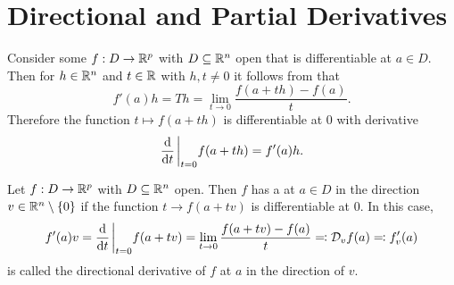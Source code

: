 \documentclass[../main.tex]{subfiles}
\begin{document}
\section[Derivatives II]{Directional and Partial Derivatives}

Consider some $f : D \to \mathbb{R}^p$ with $D \subseteq \mathbb{R}^n$ open that is differentiable at $a \in D$. Then for $h \in \mathbb{R}^n$ and $t \in \mathbb{R}$ with $h, t \neq 0$ it follows from  that
\[
    f'(a) h = Th = \lim_{t \to 0} \frac{f(a + th) - f(a)}{t}
.\]
Therefore the function $t \mapsto f(a+th)$ is differentiable at $0$ with derivative
\[
    \dv{t} \eval_{t=0} f(a+th) = f'(a) h
.\]

\begin{definition}
    \label{def:directional_derivative}
    Let $f : D \to \mathbb{R}^p$ with $D \subseteq \mathbb{R}^n$ open. Then $f$ has a  at $a \in D$ in the direction $v \in \mathbb{R}^n \setminus\qty{0}$ if the function $t \to f(a + tv)$ is differentiable at $0$. In this case,
    \[
        f'(a) v = \dv{t} \eval_{t=0} f(a+tv) = \lim_{t \to 0} \frac{f(a+tv) - f(a)}{t} \eqcolon \mathcal{D}_{v} f(a) \eqcolon f'_{v}(a)
    \]
    is called the directional derivative of $f$ at $a$ in the direction of $v$.
\end{definition}
\end{document}
